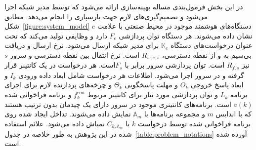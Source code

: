 در این بخش فرمول‌بندی مساله بهینه‌سازی ارائه می‌شود که توسط مدیر شبکه اجرا می‌شود و تصمیم‌گیری‌های لازم جهت بارسپاری را انجام می‌دهد. مطابق شکل~\ref{figure:system_model} دستگاه‌های هوشمند موجود در محیط صنعتی با علامت $e$ نشان داده می‌شوند. هر دستگاه توان پردازشی $F_e$ دارد و وظایفی تولید می‌کند که تحت عنوان درخواست‌های دستگاه $\mathbb{K}_e$ برای مدیر شبکه ارسال می‌شود. نرخ ارسال و دریافت بی‌سیم به و از نقطه دسترسی، $R_{w,e,s}$ است. نرخ انتقال بین نقطه دسترسی و سرور $s$ نیز $R_{f,s}$ است. توان پردازشی سرور برابر با $F_s$است. هر درخواست در یک کانتینر قرار گرفته و در سرور اجرا می‌شود. اطلاعات هر درخواست شامل ابعاد داده ورودی $I_k$ و ابعاد پاسخ خروجی $O_k$ و مهلت پاسخگویی $\Theta_k$ و چرخه‌های پردازنده لازم برای اجرای برنامه $L_k$ و توان پردازشی مورد نیاز برای کانتینر مربوط $f^{con}_k$  و برنامه فراخوانی شده $a(k)$ است. برنامه‌های کانتینری موجود در سرور دارای یک چیدمان بدون ترتیب هستند که با اندایس $m$ و مجموعه برنامه‌ها با $\mathbb{A}_m$ نمایش داده می‌شوند. تداخل ایجاد شده روی برنامه فراخوانی شده توسط درخواست $k$ با $C_{k,\mathbb{A}_m}$ نمیاش داده می‌شود. علائم استفاده شده در این پژوهش به طور خلاصه در جدول~\ref{table:problem_notations} آورده شده است.

